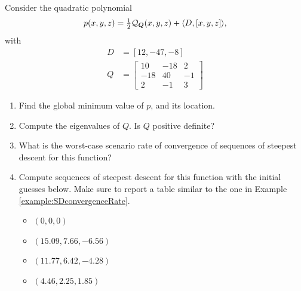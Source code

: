 \begin{problem}
Consider the quadratic polynomial 
\begin{equation*}
p(x,y,z) = \tfrac{1}{2} \mathcal{Q}_{\boldsymbol{Q}}(x,y,z) + \langle D, [x,y,z] \rangle,
\end{equation*}
with
\begin{align*}
D &= [12, -47, -8] \\
Q &= \begin{bmatrix} 10 & -18 & 2 \\ -18 & 40 & -1 \\ 2 & -1 & 3 \end{bmatrix}
\end{align*}
\begin{enumerate}
	\item Find the global minimum value of $p$, and its location.
	\item Compute the eigenvalues of $Q$.  Is $Q$ positive definite?
	\item What is the worst-case scenario rate of convergence of sequences of steepest descent for this function?
	\item Compute sequences of steepest descent for this function with the initial guesses below.  Make sure to report a table similar to the one in Example \ref{example:SDconvergenceRate}.
	\begin{itemize}
		\item $(0,0,0)$
		\item $(15.09, 7.66, -6.56)$
		\item $(11.77, 6.42, -4.28)$
		\item $(4.46, 2.25, 1.85)$
	\end{itemize}
\end{enumerate}
\end{problem}